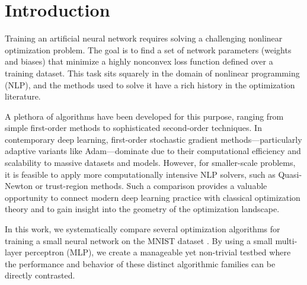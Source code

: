 \documentclass[20pt]{article}
\begin{document}
\clearpage

\section{Introduction}
Training an artificial neural network requires solving a challenging nonlinear optimization problem. The goal is to find a set of network parameters (weights and biases) that minimize a highly nonconvex loss function defined over a training dataset. This task sits squarely in the domain of nonlinear programming (NLP), and the methods used to solve it have a rich history in the optimization literature.

A plethora of algorithms have been developed for this purpose, ranging from simple first-order methods to sophisticated second-order techniques. In contemporary deep learning, first-order stochastic gradient methods—particularly adaptive variants like Adam—dominate due to their computational efficiency and scalability to massive datasets and models. However, for smaller-scale problems, it is feasible to apply more computationally intensive NLP solvers, such as Quasi-Newton or trust-region methods. Such a comparison provides a valuable opportunity to connect modern deep learning practice with classical optimization theory and to gain insight into the geometry of the optimization landscape.

In this work, we systematically compare several optimization algorithms for training a small neural network on the MNIST dataset \cite{LeCun1998MNIST}. By using a small multi-layer perceptron (MLP), we create a manageable yet non-trivial testbed where the performance and behavior of these distinct algorithmic families can be directly contrasted.
\end{document}
